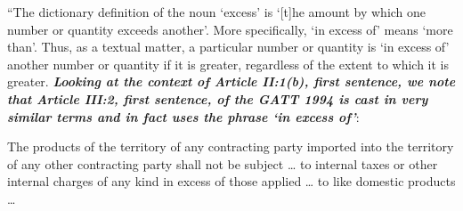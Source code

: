 \begin{displayquote}[][]
    \begin{center}
    \end{center}
  
    \begin{displayquote}[][]
    ``The dictionary definition of the noun `excess' is `[t]he amount by which one number
        or quantity exceeds another'. More specifically, `in excess of' means `more than'. Thus,
        as a textual matter, a particular number or quantity is `in excess of' another number
        or quantity if it is greater, regardless of the extent to which it is greater. 
      \textbf{\textit{Looking at the context of Article II:1(b), first sentence, we note that Article III:2, first
      sentence, of the GATT 1994 is cast in very similar terms and in fact uses the phrase
      `in excess of'}}:\\
        \begin{displayquote}
        The products of the territory of any contracting party imported into the
      territory of any other contracting party shall not be subject … to internal
      taxes or other internal charges of any kind in excess of those applied … to
      like domestic products \ldots
        \end{displayquote}   
    \end{displayquote}  
  \end{displayquote}
